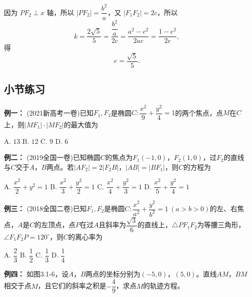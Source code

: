 \documentclass{article}
\begin{document}
因为 \(PF_2 \perp x\) 轴，所以 \(|PF_2| = \dfrac{b^2}{a}\)，又 \(|F_1F_2| = 2c\)，所以
\[
k = \frac{2\sqrt{5}}{5} = \frac{\dfrac{b^2}{a}}{2c} = \frac{a^2 - c^2}{2ac} = \frac{1 - e^2}{2e},
\]
得
\[
e = \frac{\sqrt{5}}{5}.
\]

\begin{center}
    \subsection*{小节练习}
\end{center}
\vspace{1\baselineskip}

\noindent\textbf{例一： }(2021新高考一卷)已知$F_1,F_2$是椭圆$C:\dfrac{x^2}{9}+\dfrac{y^2}{4}=1$的两个焦点，点$M$在$C$上，则$|MF_1|\cdot|MF_2|$的最大值为
\vspace{0.5em}

\noindent
A. $13$ \quad
B. $12$ \quad
C. $9$ \quad
D. $6$
\vspace{2\baselineskip}

\noindent\textbf{例二： }(2019全国一卷)已知椭圆$C$的焦点为$F_1(-1,0)$，$F_2(1,0)$，过$F_2$的直线与$C$交于$A$，$B$两点。若$|AF_2|=2|F_2B|$，$|AB|=|BF_1|$，则$C$的方程为
\vspace{0.5em}

\noindent
A. $\dfrac{x^2}{2}+y^2=1$ \quad
B. $\dfrac{x^2}{3}+\dfrac{y^2}{2}=1$ \quad
C. $\dfrac{x^2}{4}+\dfrac{y^2}{3}=1$ \quad
D. $\dfrac{x^2}{5}+\dfrac{y^2}{4}=1$
\vspace{2\baselineskip}

\noindent\textbf{例三： }(2018全国二卷)已知$F_1,F_2$是椭圆$C:\dfrac{x^2}{a^2}+\dfrac{y^2}{b^2}=1\ (a>b>0)$的左、右焦点，$A$是$C$的左顶点，点$P$在过$A$且斜率为$\dfrac{\sqrt{3}}{6}$的直线上，$\triangle PF_1F_2$为等腰三角形，$\angle F_1F_2P=120^\circ$，则$C$的离心率为
\vspace{0.5em}

\noindent
A. $\dfrac{2}{3}$ \quad
B. $\dfrac{1}{2}$ \quad
C. $\dfrac{1}{3}$ \quad
D. $\dfrac{1}{4}$
\vspace{2\baselineskip}

\noindent\textbf{例四： }如图3.1-6，设$A$，$B$两点的坐标分别为$(-5,0)$，$(5,0)$。直线$AM$，$BM$相交于点$M$，且它们的斜率之积是$-\dfrac{4}{9}$，求点$M$的轨迹方程\underline{\hspace{8em}}。
\vspace{2\baselineskip}
\end{document}
